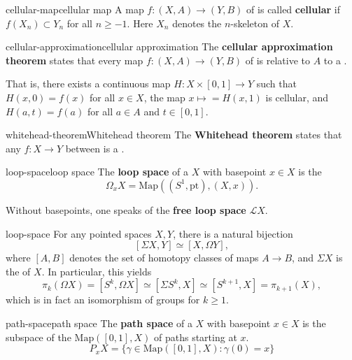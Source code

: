 \begin{topic}{cellular-map}{cellular map}
    A map $f : (X, A) \to (Y, B)$ of  is called \textbf{cellular} if $f(X_n) \subset Y_n$ for all $n \ge -1$. Here $X_n$ denotes the $n$-skeleton of $X$.
\end{topic}

\begin{topic}{cellular-approximation}{cellular approximation}
    The \textbf{cellular approximation theorem} states that every map $f : (X, A) \to (Y, B)$ of  is  relative to $A$ to a .
    
    That is, there exists a continuous map $H : X \times [0, 1] \to Y$ such that $H(x, 0) = f(x)$ for all $x \in X$, the map $x \mapsto = H(x, 1)$ is cellular, and $H(a, t) = f(a)$ for all $a \in A$ and $t \in [0, 1]$.
\end{topic}

\begin{topic}{whitehead-theorem}{Whitehead theorem}
    The \textbf{Whitehead theorem} states that any  $f : X \to Y$ between  is a .
\end{topic}

\begin{topic}{loop-space}{loop space}
    The \textbf{loop space} of a  $X$ with basepoint $x \in X$ is the 
    \[ \Omega_x X = \text{Map}((S^1, \text{pt}), (X, x)) . \]
    
    Without basepoints, one speaks of the \textbf{free loop space} $\mathcal{L} X$.
\end{topic}

\begin{example}{loop-space}
    For any pointed spaces $X, Y$, there is a natural bijection
    \[ [\Sigma X, Y] \simeq [X, \Omega Y], \]
    where $[A, B]$ denotes the set of homotopy classes of maps $A \to B$, and $\Sigma X$ is the  of $X$.
    In particular, this yields
    \[ \pi_k(\Omega X) = [ S^k, \Omega X ] \simeq [ \Sigma S^k, X ] \simeq [ S^{k + 1}, X ] = \pi_{k + 1}(X) , \]
    which is in fact an isomorphism of groups for $k \ge 1$.
\end{example}

\begin{topic}{path-space}{path space}
    The \textbf{path space} of a  $X$ with basepoint $x \in X$ is the subspace of the  $\text{Map}([0, 1], X)$ of paths starting at $x$.
    \[ P_x X = \{ \gamma \in \text{Map}([0, 1], X) : \gamma(0) = x \} \]
\end{topic}

